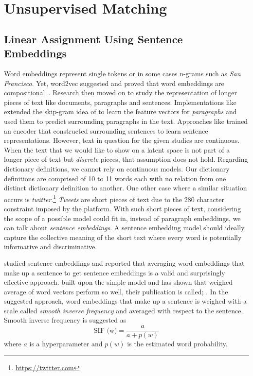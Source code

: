 \chapter{Unsupervised Matching}%
\label{chap:unsupervised_matching}


\section{Linear Assignment Using Sentence Embeddings}%
\label{sec:linear_assignment_using_sentence_embeddings}
Word embeddings represent single tokens or in some cases n-grams such as \emph{San Francisco}.
Yet, word2vec suggested and proved that word embeddings are compositional~\cite{mikolov_distributed_2013}.
Research then moved on to study the representation of longer pieces of text like documents, paragraphs and sentences.
Implementations like \textcite{le_distributed_2014} extended the skip-gram idea of \textcite{mikolov_distributed_2013} to learn the feature vectors for \emph{paragraphs} and used them to predict surrounding paragraphs in the text.
Approaches like \textcite{kiros_skip-thought_2015} trained an encoder that constructed surrounding sentences to learn sentence representations.
However, text in question for the given studies are continuous.
When the text that we would like to show on a latent space is not part of a longer piece of text but \emph{discrete} pieces, that assumption does not hold.
Regarding dictionary definitions, we cannot rely on continuous models.
Our dictionary definitions are comprised of 10 to 11 words each with no relation from one distinct dictionary definition to another.
One other case where a similar situation occurs is \emph{twitter}.\footnote{\url{https://twitter.com}}
\emph{Tweets} are short pieces of text due to the 280 character constraint imposed by the platform.
With such short pieces of text, considering the scope of a possible model could fit in, instead of paragraph embeddings, we can talk about \emph{sentence embeddings}.
A sentence embedding model should ideally capture the collective meaning of the short text where every word is potentially informative and discriminative.

\textcite{wieting_towards_2015} studied sentence embeddings and reported that averaging word embeddings that make up a sentence to get sentence embeddings is a valid and surprisingly effective approach.
\textcite{arora_simple_2016} built upon the simple model and has shown that weighed average of word vectors perform so well, their publication is called; .
In the suggested approach, word embeddings that make up a sentence is weighed with a scale called \emph{smooth inverse frequency} and averaged with respect to the sentence.
Smooth inverse frequency is suggested as
\begin{displaymath}
    \text{SIF (w)} = \frac{a}{a + p(w)}
\end{displaymath}
where $a$ is a hyperparameter and $p(w)$ is the estimated word probability.

